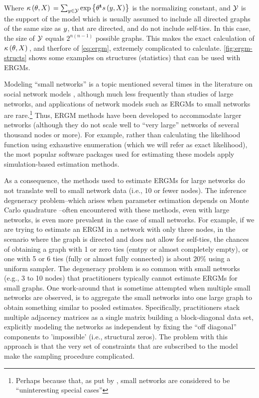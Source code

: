 \documentclass[12pt]{article}
\begin{document}
\noindent Where $\kappa\left(\theta, X\right){} = \sum_{y\in\mathcal{Y}}\mbox{exp}\left\{{\theta}^\mathbf{t}s\left(y, X\right)\right\}$ is the normalizing constant, and $\mathcal{Y}$ is the support of the model which is usually assumed to include all directed graphs of the same size as $y$, that are directed, and do not include self-ties. In this case, the size of $\mathcal{Y}$ equals $2^{n(n-1)}$ possible graphs. This makes the exact calculation of $\kappa\left(\theta, X\right){}$, and therfore of \eqref{eq:ergm}, extremely complicated to calculate. \autoref{fig:ergm-structs} shows some examples on structures (statistics) that can be used with ERGMs.

Modeling ``small networks'' is a topic mentioned several times in the literature on social network models  \cite{Wasserman1996,Frank1986,Snijders2011},  although much less frequently than studies of large networks, and applications of network models such as ERGMs to small networks are rare.\footnote{Perhaps because that, as put by \cite{Snijders2011}, small networks are considered to be ``uninteresting special cases''} Thus, ERGM methods have been developed to accommodate larger networks (although they do not scale well to ``very large'' networks of several thousand nodes or more). For example, rather than calculating the likelihood function using exhaustive enumeration (which we will refer as exact likelihood), the most popular software packages used for estimating these models apply simulation-based estimation methods.

As a consequence, the methods used to estimate ERGMs for large networks do not translate well to small network data (i.e., 10 or fewer nodes). The inference degeneracy problem--which arises when parameter estimation depends on Monte Carlo quadrature \cite{Strauss1986,Handcock2003}--often encountered with these methods, even with large networks, is even more prevalent in the case of small networks. For example, if we are trying to estimate an ERGM in a network with only three nodes, in the scenario where the graph is directed and does not allow for self-ties, the chances of obtaining a graph with 1 or zero ties (emtpy or almost completely empty), or one with 5 or 6 ties (fully or almost fully connected) is about 20\% using a uniform sampler. The degeneracy problem is so common with small networks (e.g., 3 to 10 nodes) that practitioners typically cannot estimate ERGMs for small graphs. One work-around that is sometime attempted when multiple small networks are observed, is to aggregate the small networks into one large graph to obtain something similar to pooled estimates. Specifically, practitioners stack multiple adjacency matrices as a single matrix  building a block-diagonal data set, explicitly modeling the networks as independent by fixing the ``off diagonal'' components to 'impossible' (i.e., structural zeros). The problem with this approach is that the very set of constraints that are subscribed to the model make the sampling procedure complicated. 
\end{document}
